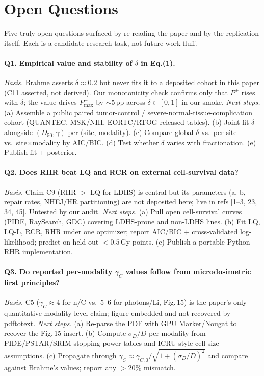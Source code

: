 \section*{Open Questions}

Five truly-open questions surfaced by re-reading the paper and by the
replication itself. Each is a candidate research task, not future-work
fluff.

\paragraph{Q1. Empirical value and stability of $\delta$ in Eq.(1).}
\emph{Basis.} Brahme asserts $\delta \approx 0.2$ but never fits it to a
deposited cohort in this paper (C11 asserted, not derived). Our
monotonicity check confirms only that $P^{+}$ rises with $\delta$; the
value drives $P^{+}_{\max}$ by $\sim$5\,pp across $\delta\in[0,1]$ in
our smoke.
\emph{Next steps.} (a) Assemble a public paired
tumor-control / severe-normal-tissue-complication cohort (QUANTEC,
MSK/NIH, EORTC/RTOG released tables). (b) Joint-fit $\delta$ alongside
$(D_{50},\gamma)$ per (site, modality). (c) Compare global $\delta$
vs.\ per-site vs.\ site$\times$modality by AIC/BIC. (d) Test whether
$\delta$ varies with fractionation. (e) Publish fit + posterior.

\paragraph{Q2. Does RHR beat LQ and RCR on external cell-survival data?}
\emph{Basis.} Claim C9 (RHR $>$ LQ for LDHS) is central but its
parameters (a, b, repair rates, NHEJ/HR partitioning) are not deposited
here; live in refs [1--3, 23, 34, 45]. Untested by our audit.
\emph{Next steps.} (a) Pull open cell-survival curves (PIDE, RaySearch,
GDC) covering LDHS-prone and non-LDHS lines. (b) Fit LQ, LQ-L, RCR,
RHR under one optimizer; report AIC/BIC + cross-validated log-likelihood;
predict on held-out $<0.5$\,Gy points. (c) Publish a portable Python
RHR implementation.

\paragraph{Q3. Do reported per-modality $\gamma_C$ values follow from microdosimetric first principles?}
\emph{Basis.} C5 ($\gamma_C\approx 4$ for n/C vs.\ 5--6 for photons/Li,
Fig.\,15) is the paper's only quantitative modality-level claim;
figure-embedded and not recovered by pdftotext.
\emph{Next steps.} (a) Re-parse the PDF with GPU Marker/Nougat to
recover the Fig.\,15 insert. (b) Compute $\sigma_D/\bar{D}$ per modality
from PIDE/PSTAR/SRIM stopping-power tables and ICRU-style cell-size
assumptions. (c) Propagate through
$\gamma_C\approx\gamma_{C,0}/\sqrt{1+(\sigma_D/\bar{D})^2}$
and compare against Brahme's values; report any $>20\%$ mismatch.

